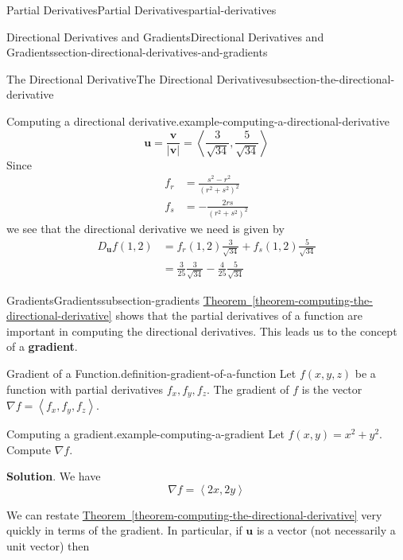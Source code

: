 \documentclass[oneside,10pt,]{book}
\newcommand{\terminology}[1]{\textbf{#1}}
\numberwithin{equation}{section}
\newcommand{\vv}[1]{\mathbf{#1}}
\newcommand{\grad}{\nabla}
\newcommand{\dotprod}[1]{\left\langle #1 \right\rangle}
\begin{document}
\begin{chapterptx}{Partial Derivatives}{}{Partial Derivatives}{}{}{partial-derivatives}
\begin{sectionptx}{Directional Derivatives and Gradients}{}{Directional Derivatives and Gradients}{}{}{section-directional-derivatives-and-gradients}
\begin{subsectionptx}{The Directional Derivative}{}{The Directional Derivative}{}{}{subsection-the-directional-derivative}
\begin{example}{Computing a directional derivative.}{example-computing-a-directional-derivative}
\begin{equation*}
\vv{u} = \frac{\vv{v}}{|\vv{v}|} = \dotprod{\frac{3}{\sqrt{34}}, \frac{5}{\sqrt{34}}}
\end{equation*}
Since%
\begin{align*}
f_{r} & = \frac{s^{2} - r^{2}}{(r^{2} + s^{2})^{2}} \\
f_{s} & = -\frac{2rs}{(r^{2} + s^{2})^{2}} 
\end{align*}
we see that the directional derivative we need is given by%
\begin{align*}
D_{\vv{u}}f(1,2) & = f_{r}(1,2)\frac{3}{\sqrt{34}} + f_{s}(1,2)\frac{5}{\sqrt{34}} \\
& = \frac{3}{25}\frac{3}{\sqrt{34}} - \frac{4}{25}\frac{5}{\sqrt{34}} 
\end{align*}
%
\end{example}
\end{subsectionptx}
%
%
\typeout{************************************************}
\typeout{************************************************}
%
\begin{subsectionptx}{Gradients}{}{Gradients}{}{}{subsection-gradients}
\hypertarget{p-1407}{}%
\hyperref[theorem-computing-the-directional-derivative]{Theorem~\ref{theorem-computing-the-directional-derivative}} shows that the partial derivatives of a function are important in computing the directional derivatives. This leads us to the concept of a \terminology{gradient}.%
\begin{definition}{Gradient of a Function.}{definition-gradient-of-a-function}%
\hypertarget{p-1408}{}%
Let \(f(x,y,z)\) be a function with partial derivatives \(f_{x}, f_{y}, f_{z}\). The gradient of \(f\) is the vector \(\grad f = \dotprod{f_{x}, f_{y}, f_{z}}\).%
\end{definition}
\begin{example}{Computing a gradient.}{example-computing-a-gradient}%
\hypertarget{p-1409}{}%
Let \(f(x,y) = x^{2} + y^{2}\). Compute \(\grad f\).%
\par\smallskip%
\noindent\textbf{Solution}.\hypertarget{solution-228}{}\quad%
\hypertarget{p-1410}{}%
We have%
\begin{equation*}
\grad f = \dotprod{2x, 2y}
\end{equation*}
%
\end{example}
\hypertarget{p-1411}{}%
We can restate \hyperref[theorem-computing-the-directional-derivative]{Theorem~\ref{theorem-computing-the-directional-derivative}} very quickly in terms of the gradient. In particular, if \(\vv{u}\) is a vector (not necessarily a unit vector) then%

\end{subsectionptx}
\end{sectionptx}
\end{chapterptx}
\end{document}
